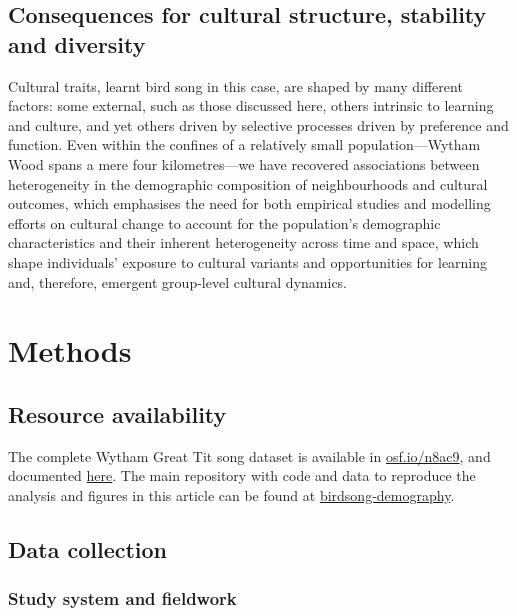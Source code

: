\subsection{Consequences for cultural structure, stability and diversity}

Cultural traits, learnt bird song in this case, are shaped by many different factors: some external, such as those discussed here, others intrinsic to learning and culture, and yet others driven by selective processes driven by preference and function. Even within the confines of a relatively small population---Wytham Wood spans a mere four kilometres---we have recovered associations between heterogeneity in the demographic composition of neighbourhoods and cultural outcomes, which emphasises the need for both empirical studies and modelling efforts on cultural change to account for the population's demographic characteristics and their inherent heterogeneity across time and space, which shape individuals’ exposure to cultural variants and opportunities for learning and, therefore, emergent group-level cultural dynamics.

\section{Methods}

\subsection{Resource availability}

The complete Wytham Great Tit song dataset is available in \href{https://osf.io/n8ac9}{osf.io/n8ac9}, and documented \href{https://nilomr.github.io/great-tit-hits/}{here}. The main repository with code and data to reproduce the analysis and figures in this article can be found at \href{http://github.com/nilomr/birdsong-demography}{birdsong-demography}.

\subsection{Data collection}

\subsubsection{Study system and fieldwork}

